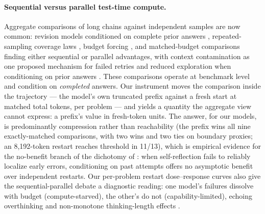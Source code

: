\paragraph{Sequential versus parallel test-time compute.}
Aggregate comparisons of long chains against independent samples are now
common: revision models conditioned on complete prior answers
\citep{snell2024}, repeated-sampling coverage laws \citep{brown2024monkeys},
budget forcing \citep{muennighoff2025s1}, and matched-budget comparisons
finding either sequential \citep{sharma2025sequentialedge} or parallel
\citep{ghosal2025mirage, pgap2026} advantages, with context contamination
as one proposed mechanism for failed retries \citep{yang2026retrying} and
reduced exploration when conditioning on prior answers \citep{pgap2026}. These comparisons operate at benchmark
level and condition on \emph{completed} answers. Our instrument moves the
comparison inside the trajectory --- the model's own truncated prefix
against a fresh start at matched total tokens, per problem --- and yields a
quantity the aggregate view cannot express: a prefix's value in fresh-token
units. The answer, for our models, is predominantly compression rather than
reachability (the prefix wins all nine exactly-matched comparisons, with
two wins and two ties on boundary proxies; an 8{,}192-token restart
reaches threshold in 11/13), which is empirical evidence for the no-benefit branch of the dichotomy of
\citet{wolf2026theory}: when self-reflection fails to reliably localize
early errors, conditioning on past attempts offers no asymptotic benefit
over independent restarts. Our per-problem restart dose--response curves also
give the sequential-parallel debate a diagnostic reading: one model's
failures dissolve with budget (compute-starved), the other's do not
(capability-limited), echoing overthinking \citep{chen2025overthinking}
and non-monotone thinking-length effects \citep{zhou2026morethinking}.

